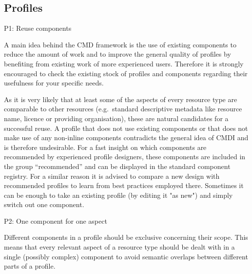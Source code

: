 \subsection{Profiles}\label{profiles}

P1: Reuse components

 

A main idea behind the CMD framework is the use of existing components to reduce the amount of work and to improve the general quality of profiles by benefiting from existing work of more experienced users. Therefore it is strongly encouraged to check the existing stock of profiles and components regarding their usefulness for your specific needs.

\begin{workinprogress}
As it is very likely that at least some of the aspects of every resource type are comparable to other resources (e.g.~standard descriptive metadata like resource name, licence or providing organisation), these are natural candidates for a successful reuse. A profile that does not use existing components or that does not make use of any non-inline components contradicts the general idea of CMDI and is therefore undesirable. For a fast insight on which components are recommended by experienced profile designers, these components are included in the
group ``recommended'' and can be displayed in the standard component registry. 
For a similar reason it is advised to compare a new design with recommended profiles to learn from best practices employed there. Sometimes it can be enough to take an existing profile (by editing it "as new") and simply switch out one component.

\end{workinprogress}


P2: One component for one aspect


Different components in a profile should be exclusive concerning their scope. This means that every relevant aspect of a resource type should be dealt with in a single (possibly complex) component to avoid semantic overlaps between different parts of a profile.

